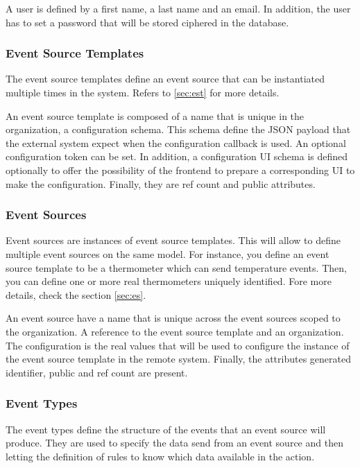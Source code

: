 A user is defined by a first name, a last name and an email. In addition, the user has to set a password that will be stored ciphered in the database.

\subsubsection{Event Source Templates}

The event source templates define an event source that can be instantiated multiple times in the system. Refers to \ref{sec:est} for more details.

An event source template is composed of a name that is unique in the organization, a configuration schema. This schema define the JSON payload that the external system expect when the configuration callback is used. An optional configuration token can be set. In addition, a configuration UI schema is defined optionally to offer the possibility of the frontend to prepare a corresponding UI to make the configuration. Finally, they are ref count and public attributes.

\subsubsection{Event Sources}

Event sources are instances of event source templates. This will allow to define multiple event sources on the same model. For instance, you define an event source template to be a thermometer which can send temperature events. Then, you can define one or more real thermometers uniquely identified. Fore more details, check the section \ref{sec:es}.

An event source have a name that is unique across the event sources scoped to the organization. A reference to the event source template and an organization. The configuration is the real values that will be used to configure the instance of the event source template in the remote system. Finally, the attributes generated identifier, public and ref count are present.

\subsubsection{Event Types}

The event types define the structure of the events that an event source will produce. They are used to specify the data send from an event source and then letting the definition of rules to know which data available in the action.

